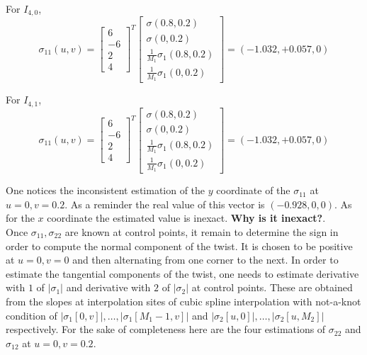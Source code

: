 \documentclass[a4paper, 11pt]{article}
\begin{document}
For $I_{4,0}$,
\begin{equation*}
\sigma_{11}(u,v) =  \begin{bmatrix} 6 \\ -6 \\ 2 \\ 4 \end{bmatrix}^T
\begin{bmatrix} \sigma(0.8,0.2)  \\ \sigma(0,0.2) \\  \frac{1}{M_1} \sigma_1(0.8,0.2) \\ \frac{1}{M_1} \sigma_1(0,0.2) 
\end{bmatrix} = (-1.032, +0.057, 0)
\end{equation*}

For $I_{4,1}$,
\begin{equation*}
\sigma_{11}(u,v) =  \begin{bmatrix} 6 \\ -6 \\ 2 \\ 4 \end{bmatrix}^T
\begin{bmatrix} \sigma(0.8,0.2)  \\ \sigma(0,0.2) \\  \frac{1}{M_1} \sigma_1(0.8,0.2) \\ \frac{1}{M_1} \sigma_1(0,0.2) 
\end{bmatrix} = (-1.032, +0.057, 0)
\end{equation*}

One notices the inconsistent estimation of the $y$ coordinate of the $\sigma_{11}$ at $u=0, v=0.2$. As a reminder the 
real value of this vector is $(-0.928, 0, 0)$. As for the $x$ coordinate the estimated value is inexact. \textbf{Why is 
it inexact?}. \\


Once $\sigma_{11}, \sigma_{22}$ are known at control points, it remain to determine the sign in order to compute the 
normal component of the twist. It is chosen to be positive at $u=0, v=0$ and then alternating from one corner to the 
next.  In order to estimate the tangential components of the twist, one needs to estimate derivative with $1$ of 
$|\sigma_1|$ and derivative with $2$ of $|\sigma_2|$ at control points. These are obtained from the slopes at 
interpolation sites of cubic spline interpolation with not-a-knot condition of $|\sigma_1[0, v]|, \ldots, 
|\sigma_1[M_1-1, v]|$ and $|\sigma_2[u, 0]|, \ldots, |\sigma_2[u, M_2]|$ respectively. For the sake of completeness here 
are the four estimations of $\sigma_{22}$ and $\sigma_{12}$ at $u=0, v=0.2$. \\
\end{document}
